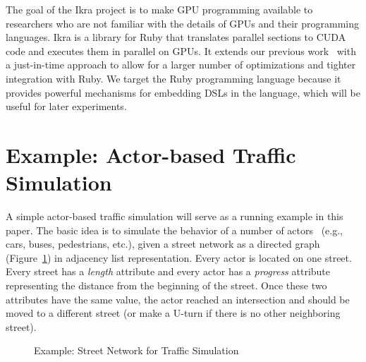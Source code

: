 \documentclass[preprint]{sigplanconf}
\begin{document}
The goal of the Ikra project is to make GPU programming available to researchers who are not familiar with the details of GPUs and their programming languages. Ikra is a library for Ruby that translates parallel sections to CUDA code and executes them in parallel on GPUs. It extends our previous work~\cite{Masuhara:2012:DER:2237887.2237888} with a just-in-time approach to allow for a larger number of optimizations and tighter integration with Ruby. We target the Ruby programming language because it provides powerful mechanisms for embedding DSLs in the language, which will be useful for later experiments.

\section{Example: Actor-based Traffic Simulation}
A simple actor-based traffic simulation will serve as a running example in this paper. The basic idea is to simulate the behavior of a number of actors~\cite{Helbing2012} (e.g., cars, buses, pedestrians, etc.), given a street network as a directed graph (Figure~\ref{fig:running_example}) in adjacency list representation. Every actor is located on one street. Every street has a \emph{length} attribute and every actor has a \emph{progress} attribute representing the distance from the beginning of the street. Once these two attributes have the same value, the actor reached an intersection and should be moved to a different street (or make a U-turn if there is no other neighboring street).

\begin{figure}[!htp]
    \centering
    
    \caption{Example: Street Network for Traffic Simulation}
    \label{fig:running_example}%
\end{figure}
\end{document}
